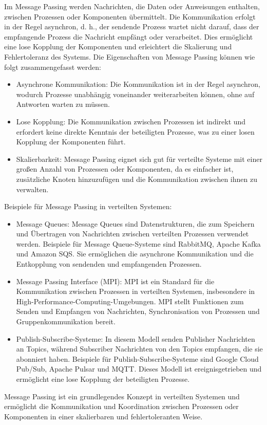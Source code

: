 \documentclass[../vs-script-first-v01.tex]{subfiles}
\begin{document}
Im Message Passing werden Nachrichten, die Daten oder Anweisungen enthalten, zwischen Prozessen oder Komponenten übermittelt. Die Kommunikation erfolgt in der Regel asynchron, d. h., der sendende Prozess wartet nicht darauf, dass der empfangende Prozess die Nachricht empfängt oder verarbeitet. Dies ermöglicht eine lose Kopplung der Komponenten und erleichtert die Skalierung und Fehlertoleranz des Systems. Die Eigenschaften von Message Passing können wie folgt zusammengefasst werden:
\begin{itemize}
\item Asynchrone Kommunikation: Die Kommunikation ist in der Regel asynchron, wodurch Prozesse unabhängig voneinander weiterarbeiten können, ohne auf Antworten warten zu müssen.
\item Lose Kopplung: Die Kommunikation zwischen Prozessen ist indirekt und erfordert keine direkte Kenntnis der beteiligten Prozesse, was zu einer losen Kopplung der Komponenten führt.
\item Skalierbarkeit: Message Passing eignet sich gut für verteilte Systeme mit einer großen Anzahl von Prozessen oder Komponenten, da es einfacher ist, zusätzliche Knoten hinzuzufügen und die Kommunikation zwischen ihnen zu verwalten.
\end{itemize}
Beispiele für Message Passing in verteilten Systemen:
\begin{itemize}
\item Message Queues: Message Queues sind Datenstrukturen, die zum Speichern und Übertragen von Nachrichten zwischen verteilten Prozessen verwendet werden. Beispiele für Message Queue-Systeme sind RabbitMQ, Apache Kafka und Amazon SQS. Sie ermöglichen die asynchrone Kommunikation und die Entkopplung von sendenden und empfangenden Prozessen.

\item Message Passing Interface (MPI): MPI ist ein Standard für die Kommunikation zwischen Prozessen in verteilten Systemen, insbesondere in High-Performance-Computing-Umgebungen. MPI stellt Funktionen zum Senden und Empfangen von Nachrichten, Synchronisation von Prozessen und Gruppenkommunikation bereit.

\item Publish-Subscribe-Systeme: In diesem Modell senden Publisher Nachrichten an Topics, während Subscriber Nachrichten von den Topics empfangen, die sie abonniert haben. Beispiele für Publish-Subscribe-Systeme sind Google Cloud Pub/Sub, Apache Pulsar und MQTT. Dieses Modell ist ereignisgetrieben und ermöglicht eine lose Kopplung der beteiligten Prozesse.
\end{itemize}
Message Passing ist ein grundlegendes Konzept in verteilten Systemen und ermöglicht die Kommunikation und Koordination zwischen Prozessen oder Komponenten in einer skalierbaren und fehlertoleranten Weise.
\end{document}
